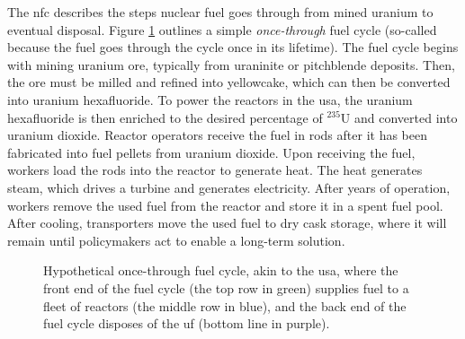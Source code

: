 The \gls{nfc} describes the steps nuclear fuel goes through
from mined uranium to eventual disposal. Figure \ref{fig:once-through} outlines a simple \textit{once-through} fuel cycle (so-called because the fuel goes through the cycle once in its lifetime). The fuel cycle begins with mining uranium ore, typically from uraninite or pitchblende deposits. Then, the ore must be milled and refined into yellowcake, which can then be converted into uranium hexafluoride. To power the reactors in the \gls{usa}, the uranium hexafluoride is then enriched to the desired percentage of $^{235}$U and converted into uranium dioxide. Reactor operators receive the fuel in rods after it has been fabricated into fuel pellets from uranium dioxide. Upon receiving the fuel, workers load the rods into the reactor to generate heat. The heat generates steam, which drives a turbine and generates electricity. After years of operation, workers remove the used fuel from the reactor and store it in a spent fuel pool. After cooling, transporters move the used fuel to dry cask storage, where it will remain until policymakers act to enable a long-term solution.

\begin{figure}[H]
    \centering
    \caption{Hypothetical once-through fuel cycle, akin to the \gls{usa}, where the front end of the fuel cycle (the top row in green) supplies fuel to a fleet of reactors (the middle row in blue), and the back end of the fuel cycle disposes of the \gls{uf} (bottom line in purple).}
    \label{fig:once-through}
\end{figure}

